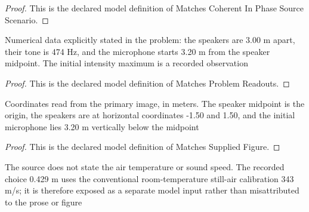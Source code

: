 \begin{proof}
  This is the declared model definition of Matches Coherent In Phase Source Scenario.
\end{proof}
\begin{definition}
  \label{def:physics:phyx-mini-0219:phyxminiproblems-problemphyxmini0219-matchesproblemreadouts}
  Numerical data explicitly stated in the problem: the speakers are 3.00 m apart, their tone is 474 Hz, and the microphone starts 3.20 m from the speaker midpoint. The initial intensity maximum is a recorded observation
\end{definition}
\begin{proof}
  This is the declared model definition of Matches Problem Readouts.
\end{proof}
\begin{definition}
  \label{def:physics:phyx-mini-0219:phyxminiproblems-problemphyxmini0219-matchessuppliedfigure}
  Coordinates read from the primary image, in meters. The speaker midpoint is the origin, the speakers are at horizontal coordinates -1.50 and 1.50, and the initial microphone lies 3.20 m vertically below the midpoint
\end{definition}
\begin{proof}
  This is the declared model definition of Matches Supplied Figure.
\end{proof}
\begin{definition}
  \label{def:physics:phyx-mini-0219:phyxminiproblems-problemphyxmini0219-usesstandardroomairsoundspeed}
  The source does not state the air temperature or sound speed. The recorded choice 0.429 m uses the conventional room-temperature still-air calibration 343 m/s; it is therefore exposed as a separate model input rather than misattributed to the prose or figure
\end{definition}
